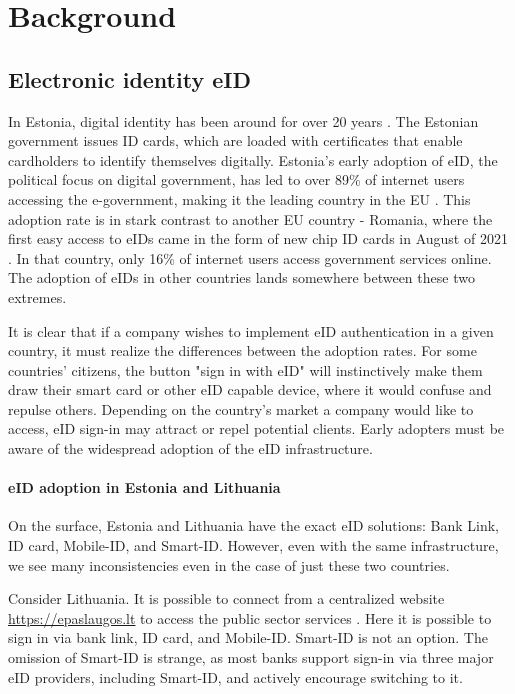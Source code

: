 \section{Background}

\subsection{Electronic identity eID}

In Estonia, digital identity has been around for over 20 years \cite{eelaw-idcard}. The Estonian government issues ID cards, which are loaded with certificates that enable cardholders to identify themselves digitally. Estonia's early adoption of eID, the political focus on digital government, has led to over 89\% of internet users accessing the e-government, making it the leading country in the EU \cite{eu-desi}. This adoption rate is in stark contrast to another EU country - Romania, where the first easy access to eIDs came in the form of new chip ID cards in August of 2021 \cite{romania-adopts-eid}. In that country, only 16\% of internet users access government services online. The adoption of eIDs in other countries lands somewhere between these two extremes.

It is clear that if a company wishes to implement eID authentication in a given country, it must realize the differences between the adoption rates. For some countries' citizens, the button "sign in with eID" will instinctively make them draw their smart card or other eID capable device, where it would confuse and repulse others. Depending on the country's market a company would like to access, eID sign-in may attract or repel potential clients. Early adopters must be aware of the widespread adoption of the eID infrastructure.

\paragraph{eID adoption in Estonia and Lithuania}

On the surface, Estonia and Lithuania have the exact eID solutions: Bank Link, ID card, Mobile-ID, and Smart-ID. However, even with the same infrastructure, we see many inconsistencies even in the case of just these two countries.

Consider Lithuania. It is possible to connect from a centralized website \url{https://epaslaugos.lt} to access the public sector services \cite{eidasnode-lt}. Here it is possible to sign in via bank link, ID card, and Mobile-ID. Smart-ID is not an option. The omission of Smart-ID is strange, as most banks support sign-in via three major eID providers, including Smart-ID, and actively encourage switching to it.

